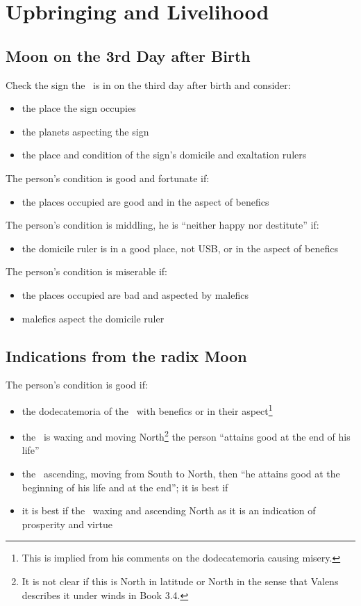 \section{Upbringing and Livelihood}
\label{sec:upbringing4}
\subsection{Moon on the 3rd Day after Birth}
Check the sign the \Moon\, is in on the third day after birth and consider:
\begin{itemize}[topsep=0em,itemsep=0em]
\item the place the sign occupies
\item the planets aspecting the sign
\item the place and condition of the sign's domicile  and exaltation rulers
\end{itemize}

\noindent The person's condition is good and fortunate if:
\begin{itemize}[topsep=0em,itemsep=0em]
\item the places occupied are good and in the aspect of benefics
\end{itemize}

\noindent The person's condition is middling, he is ``neither happy nor destitute'' if:
\begin{itemize}[topsep=0em,itemsep=0em]
\item the domicile ruler is in a good place, not USB, or in the aspect of benefics
\end{itemize}

\noindent The person's condition is miserable if:
\begin{itemize}[topsep=0em,itemsep=0em]
\item the places occupied are bad and aspected by malefics
\item malefics aspect the domicile ruler
\end{itemize}

\subsection{Indications from the radix Moon}
The person's condition is good if:
\begin{itemize}[topsep=0em,itemsep=0em]
\item the dodecatemoria of the \Moon\, with benefics or in their aspect\footnote{This is implied from his comments on the dodecatemoria causing misery.}

\item the \Moon\, is waxing and moving North\footnote{It is not clear if this is North in latitude or North in the sense that Valens describes it under winds in Book 3.4.} the person ``attains good at the end of his life''

\item the \Moon\, ascending, moving from South to North, then ``he attains good at the beginning of his life and at the end''; it is best if 

\item it is best if the \Moon\, waxing and ascending North as it is an indication of prosperity and virtue
\end{itemize}

